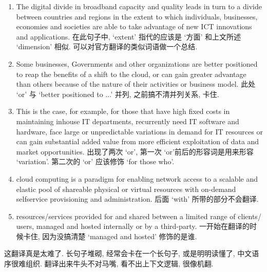 \documentclass[a4paper, UTF8, 12pt]{article}
\begin{document}
\begin{enumerate}
    \item The digital divide in broadband capacity and quality leads in turn to a divide between countries and regions in the extent to which individuals, businesses, economies and societies are able to take advantage of new ICT innovations and applications. 在此句子中, `extent' 指代的应该是 `方面' 和上文所述 `dimension' 相似. 可以对官方翻译的类似词语做一个总结.
    
    \item  Some businesses, Governments and other organizations are better positioned to reap the benefits of a shift to the cloud, or can gain greater advantage than others because of the nature of their activities or business model. 此处 `or' 与 `better positioned to ...' 并列, 之前搞不清并列关系, 卡住.
    
    \item This is the case, for example, for those that have high fixed costs in maintaining inhouse IT departments, recurrently need IT software and hardware, face large or unpredictable variations in demand for IT resources or can gain substantial added value from more efficient exploitation of data and market opportunities. 出现了两次 `or', 第一次 `or'前后的形容词是用来形容 `variation'. 第二次的 `or' 应该修饰 `for those who'. 
    
    \item cloud computing is a paradigm for enabling network access to a scalable and elastic pool of shareable physical or virtual resources with on-demand selfservice provisioning and administration. 后面 `with' 所带的部分不会翻译.
    
    \item resources/services provided for and shared between a limited range of clients/ users, managed and hosted internally or by a third-party. 一开始在翻译的时候卡住, 因为没搞清楚 `managed and hosted' 修饰的是谁.
\end{enumerate}

这翻译真是太难了. 长句子堆砌, 经常会卡在一个长句子, 或是明明读懂了, 中文语序很难组织. 翻译出来牛头不对马嘴, 看不出上下文逻辑, 很像机翻.
\end{document}
